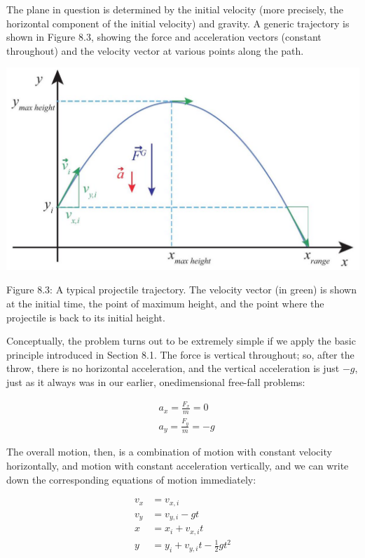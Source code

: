 \documentclass[10pt]{article}
\begin{document}
The plane in question is determined by the initial velocity (more precisely, the horizontal component of the initial velocity) and gravity. A generic trajectory is shown in Figure 8.3, showing the force and acceleration vectors (constant throughout) and the velocity vector at various points along the path.

\begin{center}
\includegraphics[max width=\textwidth]{2024_09_14_9969b06773f10b6936e8g-182}
\end{center}

Figure 8.3: A typical projectile trajectory. The velocity vector (in green) is shown at the initial time, the point of maximum height, and the point where the projectile is back to its initial height.

Conceptually, the problem turns out to be extremely simple if we apply the basic principle introduced in Section 8.1. The force is vertical throughout; so, after the throw, there is no horizontal acceleration, and the vertical acceleration is just $-g$, just as it always was in our earlier, onedimensional free-fall problems:


\begin{align*}
& a_{x}=\frac{F_{x}}{m}=0 \\
& a_{y}=\frac{F_{y}}{m}=-g \tag{8.4}
\end{align*}


The overall motion, then, is a combination of motion with constant velocity horizontally, and motion with constant acceleration vertically, and we can write down the corresponding equations of motion immediately:


\begin{align*}
v_{x} & =v_{x, i} \\
v_{y} & =v_{y, i}-g t \\
x & =x_{i}+v_{x, i} t \\
y & =y_{i}+v_{y, i} t-\frac{1}{2} g t^{2} \tag{8.5}
\end{align*}
\end{document}
